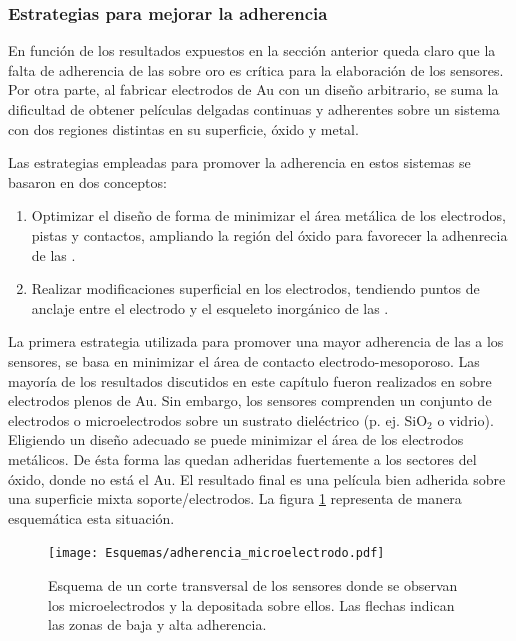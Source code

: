 		\subsubsection{Estrategias para mejorar la adherencia}\label{sec:adherencia}

			 En función de los resultados expuestos en la sección anterior queda claro que la falta de adherencia de las \pdm\space sobre oro es crítica para la elaboración de los sensores. Por otra parte, al fabricar electrodos de Au con un diseño arbitrario, se suma la dificultad de obtener películas delgadas continuas y adherentes sobre un sistema con dos regiones distintas en su superficie, óxido y metal.
 
             Las estrategias empleadas para promover la adherencia en estos sistemas se basaron en dos conceptos:
				\begin{enumerate}

					\item Optimizar el diseño de forma de minimizar el área metálica de los electrodos, pistas y contactos, ampliando la región del óxido para favorecer la adhenrecia de las \pdm.

					\item Realizar modificaciones superficial en los electrodos, tendiendo puntos de anclaje entre el electrodo y el esqueleto inorgánico de las \pdm.

					\end{enumerate}
			
			 La primera estrategia utilizada para promover una mayor adherencia de las \pdm\space a los sensores, se basa en minimizar el área de contacto electrodo-mesoporoso. Las mayoría de los resultados discutidos en este capítulo fueron realizados en \pdm\space sobre electrodos plenos de Au. Sin embargo, los sensores comprenden un conjunto de electrodos o microelectrodos sobre un sustrato dieléctrico (p. ej. SiO$_2$ o vidrio). Eligiendo un diseño adecuado se puede minimizar el área de los electrodos metálicos. De ésta forma las \pdm\space quedan adheridas fuertemente a los sectores del óxido, donde no está el Au. El resultado final es una película bien adherida sobre una superficie mixta soporte/electrodos.  La figura \ref{fig:adherencia_microelectrodo} representa de manera esquemática esta situación.
			
				\begin{figure}[!ht]
					\begin{center}
					\texttt{[image: Esquemas/adherencia\_microelectrodo.pdf]}
					\caption[Adherencia a los microelectrodos.]{Esquema de un corte transversal de los sensores donde se observan los microelectrodos y la \pdm\space depositada sobre ellos. Las flechas indican las zonas de baja y alta adherencia.}
					\label{fig:adherencia_microelectrodo}
					\end{center}
					\end{figure}
					
